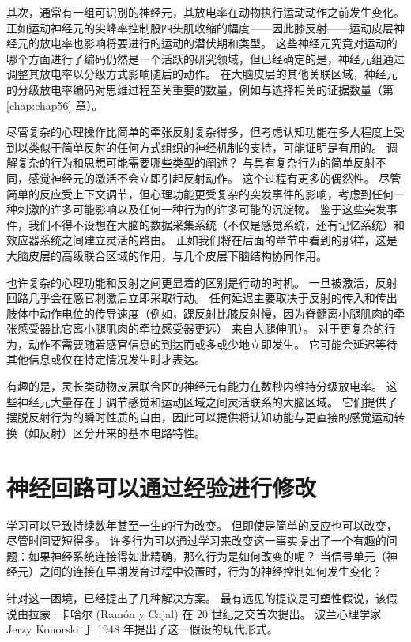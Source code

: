 其次，通常有一组可识别的神经元，其放电率在动物执行运动动作之前发生变化。 
正如运动神经元的尖峰率控制股四头肌收缩的幅度——因此膝反射——运动皮层神经元的放电率也影响将要进行的运动的潜伏期和类型。 
这些神经元究竟对运动的哪个方面进行了编码仍然是一个活跃的研究领域，但已经确定的是，神经元组通过调整其放电率以分级方式影响随后的动作。 
在大脑皮层的其他关联区域，神经元的分级放电率编码对思维过程至关重要的数量，例如与选择相关的证据数量（第 \ref{chap:chap56} 章）。


尽管复杂的心理操作比简单的牵张反射复杂得多，但考虑认知功能在多大程度上受到以类似于简单反射的任何方式组织的神经机制的支持，可能证明是有用的。 
调解复杂的行为和思想可能需要哪些类型的阐述？ 
与具有复杂行为的简单反射不同，感觉神经元的激活不会立即引起反射动作。 
这个过程有更多的偶然性。 
尽管简单的反应受上下文调节，但心理功能更受复杂的突发事件的影响，考虑到任何一种刺激的许多可能影响以及任何一种行为的许多可能的沉淀物。 
鉴于这些突发事件，我们不得不设想在大脑的数据采集系统（不仅是感觉系统，还有记忆系统）和效应器系统之间建立灵活的路由。 
正如我们将在后面的章节中看到的那样，这是大脑皮层的高级联合区域的作用，与几个皮层下脑结构协同作用。


也许复杂的心理功能和反射之间更显着的区别是行动的时机。 
一旦被激活，反射回路几乎会在感官刺激后立即采取行动。 
任何延迟主要取决于反射的传入和传出肢体中动作电位的传导速度（例如，踝反射比膝反射慢，因为脊髓离小腿肌肉的牵张感受器比它离小腿肌肉的牵拉感受器更远） 来自大腿伸肌）。 
对于更复杂的行为，动作不需要随着感官信息的到达而或多或少地立即发生。 它可能会延迟等待其他信息或仅在特定情况发生时才表达。


有趣的是，灵长类动物皮层联合区的神经元有能力在数秒内维持分级放电率。 
这些神经元大量存在于调节感觉和运动区域之间灵活联系的大脑区域。 
它们提供了摆脱反射行为的瞬时性质的自由，因此可以提供将认知功能与更直接的感觉运动转换（如反射）区分开来的基本电路特性。


\section{神经回路可以通过经验进行修改}
学习可以导致持续数年甚至一生的行为改变。 
但即使是简单的反应也可以改变，尽管时间要短得多。 
许多行为可以通过学习来改变这一事实提出了一个有趣的问题：如果神经系统连接得如此精确，那么行为是如何改变的呢？ 
当信号单元（神经元）之间的连接在早期发育过程中设置时，行为的神经控制如何发生变化？


针对这一困境，已经提出了几种解决方案。 
最有远见的提议是可塑性假说，该假说由拉蒙·卡哈尔 (Ramón y Cajal) 在 20 世纪之交首次提出。 
波兰心理学家 Jerzy Konorski 于 1948 年提出了这一假设的现代形式。


